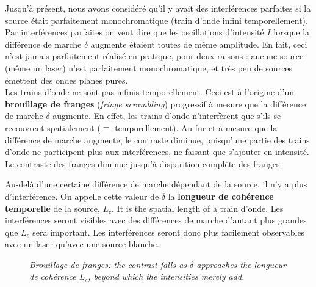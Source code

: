 Jusqu'à présent, nous avons considéré qu'il y avait des interférences parfaites
si la source était parfaitement monochromatique (train d'onde infini
temporellement). Par interférences parfaites on veut dire que les oscillations
d'intensité $I$ lorsque la différence de marche $\delta$ augmente étaient toutes
de même amplitude. En fait, ceci n'est jamais parfaitement réalisé en pratique,
pour deux raisons : aucune source (même un laser) n'est parfaitement
monochromatique, et très peu de sources émettent des ondes planes pures.\\

Les trains d'onde ne sont pas infinis temporellement. Ceci est à l'origine d'un
\textbf{brouillage de franges} (\textit{fringe scrambling}) progressif à mesure
que la différence de marche $\delta$ augmente. En effet, les trains d'onde
n'interfèrent que s'ils se recouvrent spatialement ($\equiv$ temporellement). Au
fur et à mesure que la différence de marche augmente, le contraste diminue,
puisqu'une partie des trains d'onde ne participent plus aux interférences, ne
faisant que s'ajouter en intensité. Le contraste des franges diminue jusqu'à
disparition complète des franges.

\begin{definition}
  Au-delà d'une certaine différence de marche dépendant de la source, il n'y a
  plus d'interférence. On appelle cette valeur de $\delta$ la
  \textbf{longueur de cohérence temporelle} de la source, $L_c$. It is the
  spatial length of a train d'onde. Les interférences seront visibles avec des
  différences de marche d'autant plus grandes que $L_c$ sera important. Les
  interférences seront donc plus facilement observables avec un laser qu'avec une
  source blanche.
\end{definition}

\begin{figure}[h!]
  \centering

  \smallskip
  {\small\itshape Brouillage de franges: the contrast falls as $\delta$ approaches
  the longueur de cohérence $L_c$, beyond which the intensities merely add.}
\end{figure}

